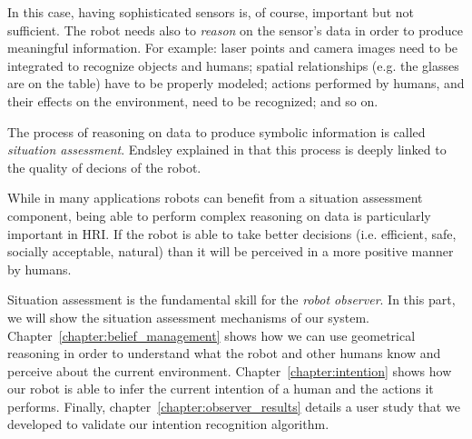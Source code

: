 In this case, having sophisticated sensors is, of course, important but not sufficient. The robot needs also to \textit{reason} on the sensor's data in order to produce meaningful information. For example: laser points and camera images need to be integrated to recognize objects and humans; spatial relationships  (e.g. the glasses are on the table) have to be properly modeled; actions performed by humans, and their effects on the environment, need to be recognized; and so on. 

The process of reasoning on data to produce symbolic information is called \textit{situation assessment}. Endsley explained in \cite{endsley1995toward} that this process is deeply linked to the quality of  decions of the robot.

While in many applications robots can benefit from a situation assessment component, being able to perform complex reasoning on data is particularly important in HRI. If the robot is able to take better decisions (i.e.  efficient, safe, socially acceptable, natural) than it will be perceived in a more positive manner by humans. 

Situation assessment is the fundamental skill for the \textit{robot observer}. In this part, we will show the situation assessment mechanisms of our system. Chapter~\ref{chapter:belief_management} shows how we can use geometrical reasoning in order to understand what the robot and other humans know and perceive about the current environment. Chapter~\ref{chapter:intention} shows how our robot is able to infer the current intention of a human and the actions it performs. Finally, chapter~\ref{chapter:observer_results} details a user study that we developed to validate our intention recognition algorithm.



 
 
 

